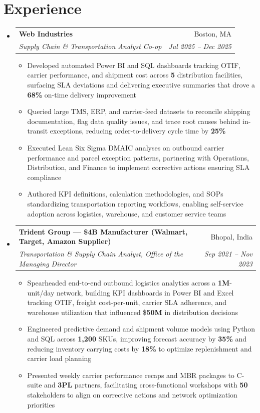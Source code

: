 \documentclass[letterpaper,10pt]{article}
\makeatletter
\newcommand{\resumeSubheading}[4]{
  \vspace{1pt}\item
    \begin{tabular*}{0.97\textwidth}[t]{l@{\extracolsep{\fill}}r}
      \textbf{#1} & #2 \\
      \textit{\small#3} & \textit{\small #4} \\
    \end{tabular*}\vspace{-4pt}
}
\newcommand{\resumeItem}[1]{\item\small{{#1 \vspace{-1pt}}}}
\newcommand{\resumeItemListStart}{\begin{itemize}[leftmargin=0.15in, label=$\bullet$]}
\newcommand{\resumeItemListEnd}{\end{itemize}\vspace{-2pt}}
\newcommand{\resumeSubHeadingListStart}{\begin{itemize}[leftmargin=0.15in, label={}]}
\newcommand{\resumeSubHeadingListEnd}{\end{itemize}}
\makeatother
\begin{document}
\section{Experience}
\resumeSubHeadingListStart
\resumeSubheading
{Web Industries}{Boston, MA}
{Supply Chain \& Transportation Analyst Co-op}{Jul 2025 -- Dec 2025}
\resumeItemListStart
\resumeItem{Developed automated Power BI and SQL dashboards tracking OTIF, carrier performance, and shipment cost across \textbf{5} distribution facilities, surfacing SLA deviations and delivering executive summaries that drove a \textbf{68\%} on-time delivery improvement}
\resumeItem{Queried large TMS, ERP, and carrier-feed datasets to reconcile shipping documentation, flag data quality issues, and trace root causes behind in-transit exceptions, reducing order-to-delivery cycle time by \textbf{25\%}}
\resumeItem{Executed Lean Six Sigma DMAIC analyses on outbound carrier performance and parcel exception patterns, partnering with Operations, Distribution, and Finance to implement corrective actions ensuring SLA compliance}
\resumeItem{Authored KPI definitions, calculation methodologies, and SOPs standardizing transportation reporting workflows, enabling self-service adoption across logistics, warehouse, and customer service teams}
\resumeItemListEnd
\resumeSubheading
{Trident Group --- \$4B Manufacturer (Walmart, Target, Amazon Supplier)}{Bhopal, India}
{Transportation \& Supply Chain Analyst, Office of the Managing Director}{Sep 2021 -- Nov 2023}
\resumeItemListStart
\resumeItem{Spearheaded end-to-end outbound logistics analytics across a \textbf{1M}-unit/day network, building KPI dashboards in Power BI and Excel tracking OTIF, freight cost-per-unit, carrier SLA adherence, and warehouse utilization that influenced \$\textbf{50M} in distribution decisions}
\resumeItem{Engineered predictive demand and shipment volume models using Python and SQL across \textbf{1,200} SKUs, improving forecast accuracy by \textbf{35\%} and reducing inventory carrying costs by \textbf{18\%} to optimize replenishment and carrier load planning}
\resumeItem{Presented weekly carrier performance recaps and MBR packages to C-suite and \textbf{3PL} partners, facilitating cross-functional workshops with \textbf{50} stakeholders to align on corrective actions and network optimization priorities}
\resumeItemListEnd
\resumeSubHeadingListEnd
\end{document}
